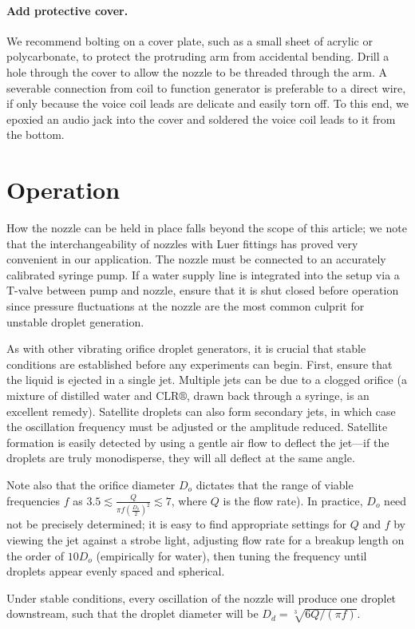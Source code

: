 \documentclass[aip,rsi,reprint,graphicx]{revtex4-1} %
\begin{document}
\paragraph{Add protective cover.} We recommend bolting on a cover plate, such
as a small sheet of acrylic or polycarbonate, to protect the protruding arm from
accidental bending. Drill a hole through the cover to allow the nozzle to be
threaded through the arm. A severable
connection from coil to function generator is preferable to a direct wire, if
only because the voice coil leads are delicate and easily torn off. To this end, we epoxied
an audio jack into the cover and soldered the voice coil leads to it from the
bottom. 

\section{Operation} How the nozzle can be held in place falls beyond the scope of
this article; we note that the interchangeability of nozzles with Luer fittings
has proved very convenient in our application. The nozzle must be connected to
an accurately calibrated syringe pump. If a water supply line is integrated into
the setup via a T-valve between pump and nozzle, ensure that it is shut closed
before operation since pressure fluctuations at the nozzle are the most common
culprit for unstable droplet generation.

As with other vibrating orifice droplet generators, it is crucial that stable
conditions are established before any experiments can begin. First, ensure that
the liquid is ejected in a single jet. Multiple jets can be due to a clogged
orifice (a mixture of distilled water and CLR$\circledR$, drawn back through a
syringe, is an excellent remedy). Satellite droplets can also form secondary
jets, in which case the oscillation frequency must be adjusted or the amplitude
reduced. Satellite
formation is easily detected by using a gentle air flow to deflect the jet---if
the droplets are truly monodisperse, they will all deflect at the same
angle.\cite{Strom69}

Note also that the orifice diameter $D_o$ dictates that the range of viable
frequencies $f$ as $3.5 \lesssim \frac{Q}{\pi f \left(\frac{D_o}{2}\right)^2}
\lesssim 7$, where $Q$ is the flow rate). \cite{Savart33, Rayleigh79} In
practice, $D_o$ need not be
precisely determined; it is easy to find appropriate settings for $Q$
and $f$ by viewing the jet against a strobe light, adjusting flow rate for a breakup
length on the order of $10 D_o$ (empirically for water), then tuning the frequency
until droplets appear evenly spaced and spherical.

Under stable conditions, every oscillation of the nozzle will produce one droplet
downstream,\cite{Rayleigh79} such that the droplet diameter will be $D_d = \sqrt[3]{6Q/(\pi f)}$.


\end{document}
